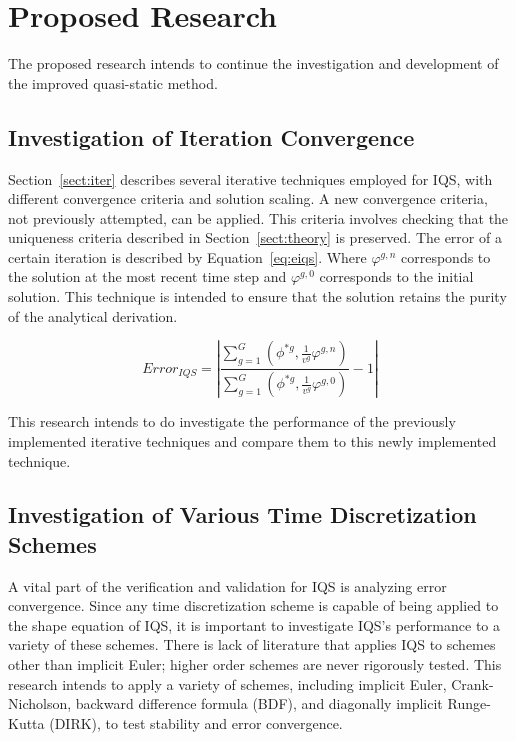 \documentclass[12pt]{scrartcl}
\newcommand{\eqt}[1]{Equation~\ref{#1}}                     %
\newcommand{\sct}[1]{Section~\ref{#1}}                   %
\newcommand{\be}{\begin{equation}}
\newcommand{\ee}{\end{equation}}
\begin{document}
\section{Proposed Research}
\label{sect:research}

The proposed research intends to continue the investigation and development of the improved quasi-static method.  

\subsection{Investigation of Iteration Convergence}
\label{sect:inv_iter}

\sct{sect:iter} describes several iterative techniques employed for IQS, with different convergence criteria and solution scaling.  A new convergence criteria, not previously attempted, can be applied.  This criteria involves checking that the uniqueness criteria described in \sct{sect:theory} is preserved.  The error of a certain iteration is described by \eqt{eq:eiqs}.  Where $\varphi^{g,n}$ corresponds to the solution at the most recent time step and $\varphi^{g,0}$ corresponds to the initial solution.  This technique is intended to ensure that the solution retains the purity of the analytical derivation.

\be
Error_{IQS}=\left|\frac{\sum_{g=1}^G\left(\phi^{*g},\frac{1}{v^g}\varphi^{g,n}\right)}{\sum_{g=1}^G\left(\phi^{*g},\frac{1}{v^g}\varphi^{g,0}\right)}-1\right|
\label{eq:eiqs}
\ee


This research intends to do investigate the performance of the previously implemented iterative techniques and compare them to this newly implemented technique.

\subsection{Investigation of Various Time Discretization Schemes}

A vital part of the verification and validation for IQS is analyzing error convergence.  Since any time discretization scheme is capable of being applied to the shape equation of IQS, it is important to investigate IQS's performance to a variety of these schemes.  There is lack of literature that applies IQS to schemes other than implicit Euler; higher order schemes are never rigorously tested.  This research intends to apply a variety of schemes, including implicit Euler, Crank-Nicholson, backward difference formula (BDF), and diagonally implicit Runge-Kutta (DIRK), to test stability and error convergence.  
\end{document}
